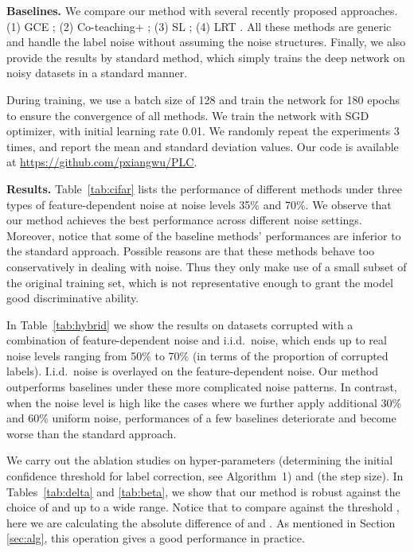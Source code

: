 \documentclass{article} \usepackage{iclr2021_conference,times}
\begin{document}
\textbf{Baselines.} We compare our method with several recently proposed approaches. (1) GCE \citep{gce_nips2018}; (2) Co-teaching+ \citep{yu_coteachingplus_2019_ICML}; (3) SL \citep{sce_cvpr2019}; (4) LRT \citep{songzhu_2020_ICML}. All these methods are generic and handle the label noise without assuming the noise structures. Finally, we also provide the results by standard method, which simply trains the deep network on noisy datasets in a standard manner.

During training, we use a batch size of 128 and train the network for 180 epochs to ensure the convergence of all methods. We train the network with SGD optimizer, with initial learning rate 0.01. We randomly repeat the experiments 3 times, and report the mean and standard deviation values. Our code is available at \url{https://github.com/pxiangwu/PLC}.

\textbf{Results.} Table~\ref{tab:cifar} lists the performance of different methods under three types of feature-dependent noise at noise levels 35\% and 70\%. We observe that our method achieves the best performance across different noise settings. Moreover, notice that some of the baseline methods' performances are inferior to the standard approach. Possible reasons are that these methods behave too conservatively in dealing with noise. Thus they only make use of a small subset of the original training set, which is not representative enough to grant the model good discriminative ability.

In Table~\ref{tab:hybrid} we show the results on datasets corrupted with a combination of feature-dependent noise and i.i.d.~noise, which ends up to real noise levels ranging from 50\% to 70\% (in terms of the proportion of corrupted labels). I.i.d.~noise is overlayed on the feature-dependent noise. Our method outperforms baselines under these more complicated noise patterns. In contrast, when the noise level is high like the cases where we further apply additional 30\% and 60\% uniform noise,  performances of a few baselines deteriorate and become worse than the standard approach. 

We carry out the ablation studies on hyper-parameters  (determining the initial confidence threshold for label correction, see Algorithm~1) and  (the step size). In Tables~\ref{tab:delta} and \ref{tab:beta}, we show that our method is robust against the choice of  and  up to a wide range. Notice that to compare against the threshold , here we are calculating the absolute difference of  and . As mentioned in Section \ref{sec:alg}, this operation gives a good performance in practice.
\end{document}
